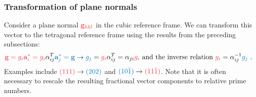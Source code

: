 \subsubsection{Transformation of plane normals}
Consider a plane normal ${\color{OCScotsRose}\mathbf{g}_{hkl}}$ in the cubic reference frame.  We can transform this vector to the tetragonal reference frame using the results from the preceding subsections:
\[
	{\color{OCScotsRose}\mathbf{g}=g_i\mathbf{a}^{\ast}_i=g_i}\alpha^T_{ij}{\color{OCHighlandsSkyBlue}\mathbf{a}^{\ast}_j=\mathbf{g}}\rightarrow {\color{OCHighlandsSkyBlue}g_j}={\color{OCScotsRose}g_i}\alpha^T_{ij}
	=\alpha_{ji}{\color{OCScotsRose}g_i}\text{ and the inverse relation }{\color{OCScotsRose}g_i}=\alpha^{-1}_{ij}{\color{OCHighlandsSkyBlue}g_j}\ .
\]
Examples include ${\color{OCScotsRose}(111)}\rightarrow  {\color{OCHighlandsSkyBlue}(202)}$ and  ${\color{OCHighlandsSkyBlue}(10\bar{1})}\rightarrow  {\color{OCScotsRose}(11\bar{1})}$.  Note that it is often necessary to rescale the resulting fractional vector components to relative prime numbers.






